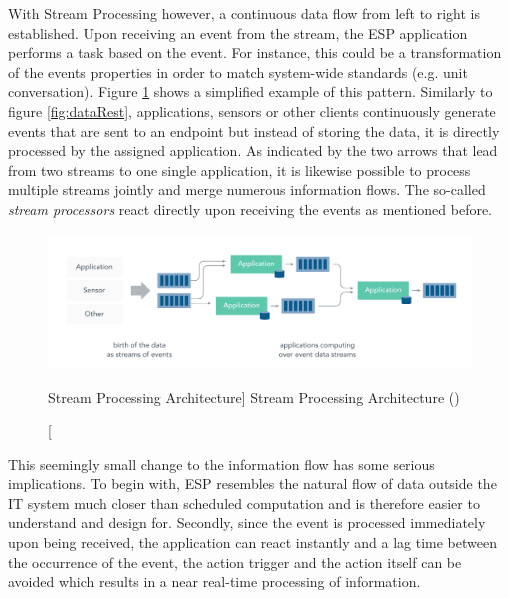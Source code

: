\begin{enumerate}
    With Stream Processing however, a continuous data flow from left to right is established. Upon receiving an event from the stream, the \acf{ESP} application performs a task based on the event. For instance, this could be a transformation of the events properties in order to match system-wide standards (e.g. unit conversation). 
    Figure \ref{fig:dataStream} shows a simplified example of this pattern. Similarly to figure \ref{fig:dataRest}, applications, sensors or other clients continuously generate events that are sent to an endpoint but instead of storing the data, it is directly processed by the assigned application. As indicated by the two arrows that lead from two streams to one single application, it is likewise possible to process multiple streams jointly and merge numerous information flows. The so-called \textit{stream processors} react directly upon receiving the events as mentioned before. 
    
    \begin{figure}[ht]
        \includegraphics[width=\linewidth]{images/streaming/streming_data.png}\centering
        \caption
        [Stream Processing Architecture]
        {Stream Processing Architecture (\cite{dataArtisans2017WhatProcessing})}
        \label{fig:dataStream}
    \end{figure}
    
    This seemingly small change to the information flow has some serious implications. To begin with, \acf{ESP} resembles the natural flow of data outside the IT system much closer than scheduled computation and is therefore easier to understand and design for. Secondly, since the event is processed immediately upon being received, the application can react instantly and a lag time between the occurrence of the event, the action trigger and the action itself can be avoided which results in a near real-time processing of information. 
    

\end{enumerate}
